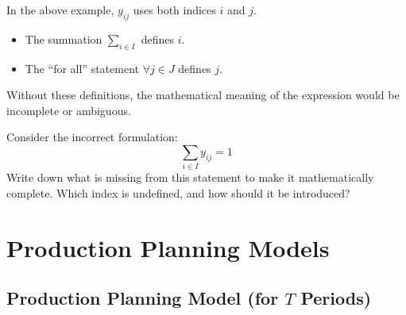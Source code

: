 In the above example, \( y_{ij} \) uses both indices \( i \) and \( j \).  
\begin{itemize}
    \item The summation \(\sum_{i \in I}\) defines \(i\).  
    \item The ``for all'' statement \(\forall j \in J\) defines \(j\).
\end{itemize}
Without these definitions, the mathematical meaning of the expression would be incomplete or ambiguous.

\begin{learningcheckpoint}[label={lc:missing-index}]
Consider the incorrect formulation:
\[
\sum_{i \in I} y_{ij} = 1
\]
Write down what is missing from this statement to make it mathematically complete. Which index is undefined, and how should it be introduced?
\end{learningcheckpoint}

\section{Production Planning Models}
\label{sec:production-planning}

\subsection*{Production Planning Model (for \(T\) Periods)}


